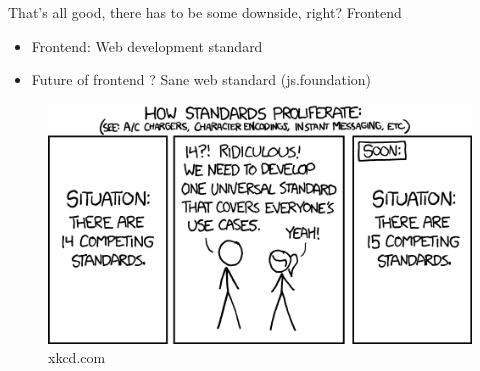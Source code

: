 \documentclass{beamer}
\begin{document}
    \begin{frame}{That's all good, there has to be some downside, right?}
  	\pause
	Frontend
	\pause
	\begin{itemize}[<+->]
		\item Frontend: Web development standard
		\item Future of frontend ? \pause Sane web standard (js.foundation)
  	\end{itemize}
	\pause
	\begin{center}
		\begin{figure}
		\includegraphics[scale=0.485]{images/standards.png}
		\caption{xkcd.com}
		\end{figure}
	\end{center}
  \end{frame}
  
\end{document}
